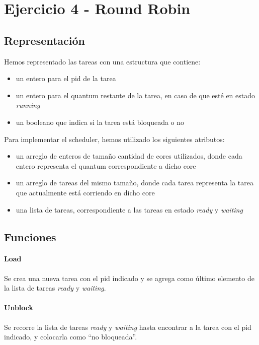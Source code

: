 \section{Ejercicio 4 - Round Robin}

\subsection{Representación}

Hemos representado las tareas con una estructura que contiene:

\begin{itemize}
\item un entero para el pid de la tarea
\item un entero para el quantum restante de la tarea, en caso de que esté en estado {\it running}
\item un booleano que indica si la tarea está bloqueada o no
\end{itemize}

Para implementar el scheduler, hemos utilizado los siguientes atributos:

\begin{itemize}
\item un arreglo de enteros de tamaño cantidad de cores utilizados, donde cada entero representa el quantum correspondiente a dicho core
\item un arreglo de tareas del mismo tamaño, donde cada tarea representa la tarea que actualmente está corriendo en dicho core
\item una lista de tareas, correspondiente a las tareas en estado {\it ready} y {\it waiting}
\end{itemize}

\subsection{Funciones}

\paragraph{Load} Se crea una nueva tarea con el pid indicado y se agrega como último elemento de la lista de tareas {\it ready} y {\it waiting}.

\paragraph{Unblock} Se recorre la lista de tareas {\it ready} y {\it waiting} hasta encontrar a la tarea con el pid indicado, y colocarla como ``no bloqueada''.

